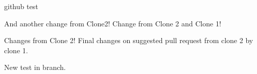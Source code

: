 \documentclass[10pt,a4paper]{report}
\begin{document}
github test

And another change from Clone2!
Change from Clone 2 and Clone 1!

Changes from Clone 2!
Final changes on suggested pull request from clone 2 by clone 1.

New test in branch.
\end{document}

